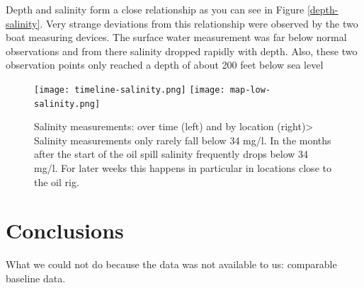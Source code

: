 \documentclass[11pt]{article}
\begin{document}
Depth and salinity form a close relationship as you can see in Figure \ref {depth-salinity}.  Very strange deviations from this relationship were observed by the two boat measuring devices. The surface water measurement was far below normal observations and from there salinity dropped rapidly with depth.  Also, these two observation points only reached a depth of about 200 feet below sea level


\begin{figure}[htbp] %
   \centering
   \texttt{[image: timeline-salinity.png]} 
   \texttt{[image: map-low-salinity.png]} 
   \caption{Salinity measurements: over time (left) and by location (right)> Salinity measurements only rarely fall below 34 mg/l. In the months after the start of the oil spill salinity frequently drops below 34 mg/l. For later weeks this happens in particular in locations close to the oil rig.}
   \label{salinity-timeline}
\end{figure}


\section{Conclusions}
What we could not do because the data was not available to us: comparable baseline data. 
\end{document}
